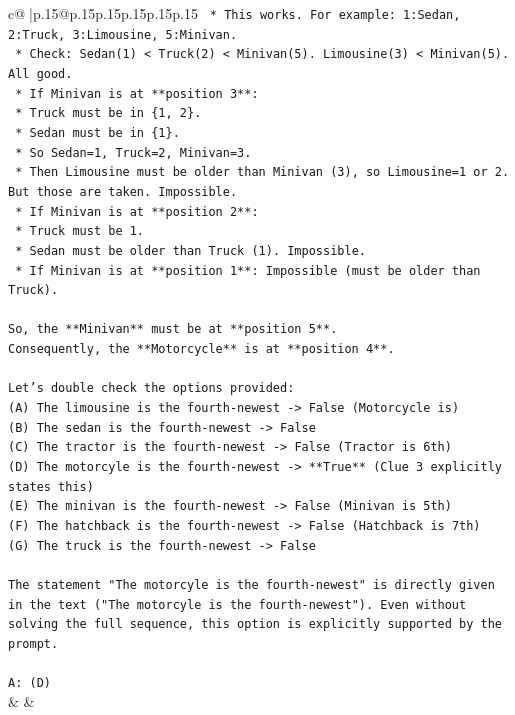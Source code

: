 \documentclass{article}
\begin{document}
{\begin{supertabular}{c@{$\;$}|p{.15\linewidth}@{}p{.15\linewidth}p{.15\linewidth}p{.15\linewidth}p{.15\linewidth}p{.15\linewidth}}
{{{\texttt{        *   This works. For example: 1:Sedan, 2:Truck, 3:Limousine, 5:Minivan.} \\
\texttt{        *   Check: Sedan(1) < Truck(2) < Minivan(5). Limousine(3) < Minivan(5). All good.} \\
\texttt{    *   If Minivan is at **position 3**:} \\
\texttt{        *   Truck must be in \{1, 2\}.} \\
\texttt{        *   Sedan must be in \{1\}.} \\
\texttt{        *   So Sedan=1, Truck=2, Minivan=3.} \\
\texttt{        *   Then Limousine must be older than Minivan (3), so Limousine=1 or 2. But those are taken. Impossible.} \\
\texttt{    *   If Minivan is at **position 2**:} \\
\texttt{        *   Truck must be 1.} \\
\texttt{        *   Sedan must be older than Truck (1). Impossible.} \\
\texttt{    *   If Minivan is at **position 1**: Impossible (must be older than Truck).} \\
\\ 
\texttt{So, the **Minivan** must be at **position 5**.} \\
\texttt{Consequently, the **Motorcycle** is at **position 4**.} \\
\\ 
\texttt{Let's double check the options provided:} \\
\texttt{(A) The limousine is the fourth{-}newest {-}> False (Motorcycle is)} \\
\texttt{(B) The sedan is the fourth{-}newest {-}> False} \\
\texttt{(C) The tractor is the fourth{-}newest {-}> False (Tractor is 6th)} \\
\texttt{(D) The motorcyle is the fourth{-}newest {-}> **True** (Clue 3 explicitly states this)} \\
\texttt{(E) The minivan is the fourth{-}newest {-}> False (Minivan is 5th)} \\
\texttt{(F) The hatchback is the fourth{-}newest {-}> False (Hatchback is 7th)} \\
\texttt{(G) The truck is the fourth{-}newest {-}> False} \\
\\ 
\texttt{The statement "The motorcyle is the fourth{-}newest" is directly given in the text ("The motorcyle is the fourth{-}newest"). Even without solving the full sequence, this option is explicitly supported by the prompt.} \\
\\ 
\texttt{A: (D)} \\
            }
        }
    }
    & & \\ \\


\end{supertabular}}
\end{document}
